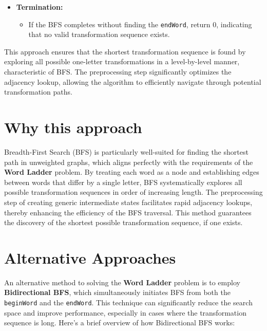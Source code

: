 \begin{itemize}
    \item \textbf{Termination:}
    \begin{itemize}
        \item If the BFS completes without finding the \texttt{endWord}, return \(0\), indicating that no valid transformation sequence exists.
    \end{itemize}
\end{itemize}

This approach ensures that the shortest transformation sequence is found by exploring all possible one-letter transformations in a level-by-level manner, characteristic of BFS. The preprocessing step significantly optimizes the adjacency lookup, allowing the algorithm to efficiently navigate through potential transformation paths.

\section*{Why this approach}

Breadth-First Search (BFS) is particularly well-suited for finding the shortest path in unweighted graphs, which aligns perfectly with the requirements of the \textbf{Word Ladder} problem. By treating each word as a node and establishing edges between words that differ by a single letter, BFS systematically explores all possible transformation sequences in order of increasing length. The preprocessing step of creating generic intermediate states facilitates rapid adjacency lookups, thereby enhancing the efficiency of the BFS traversal. This method guarantees the discovery of the shortest possible transformation sequence, if one exists.

\section*{Alternative Approaches}

An alternative method to solving the \textbf{Word Ladder} problem is to employ \textbf{Bidirectional BFS}, which simultaneously initiates BFS from both the \texttt{beginWord} and the \texttt{endWord}. This technique can significantly reduce the search space and improve performance, especially in cases where the transformation sequence is long. Here's a brief overview of how Bidirectional BFS works:

